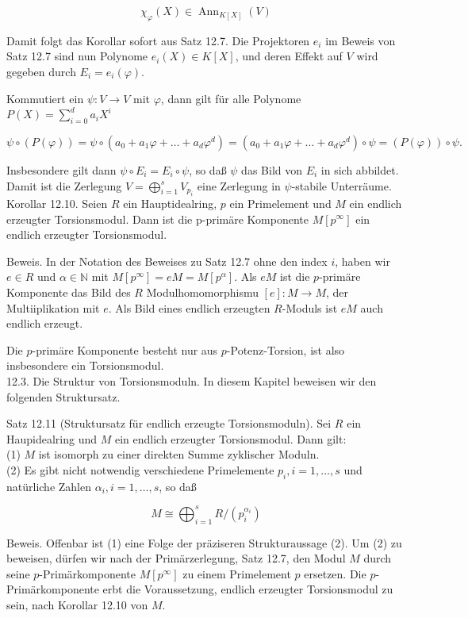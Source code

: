 \documentclass[10pt, letterpaper]{article}
\begin{document}
$$
\chi_{\varphi}(X) \in \operatorname{Ann}_{K[X]}(V)
$$

Damit folgt das Korollar sofort aus Satz 12.7. Die Projektoren $e_{i}$ im Beweis von Satz 12.7 sind nun Polynome $e_{i}(X) \in K[X]$, und deren Effekt auf $V$ wird gegeben durch $E_{i}=e_{i}(\varphi)$.

Kommutiert ein $\psi: V \rightarrow V$ mit $\varphi$, dann gilt für alle Polynome $P(X)=\sum_{i=0}^{d} a_{i} X^{i}$

$$
\psi \circ(P(\varphi))=\psi \circ\left(a_{0}+a_{1} \varphi+\ldots+a_{d} \varphi^{d}\right)=\left(a_{0}+a_{1} \varphi+\ldots+a_{d} \varphi^{d}\right) \circ \psi=(P(\varphi)) \circ \psi .
$$

Insbesondere gilt dann $\psi \circ E_{i}=E_{i} \circ \psi$, so daß $\psi$ das Bild von $E_{i}$ in sich abbildet. Damit ist die Zerlegung $V=\bigoplus_{i=1}^{s} V_{p_{i}}$ eine Zerlegung in $\psi$-stabile Unterräume.\\
Korollar 12.10. Seien $R$ ein Hauptidealring, $p$ ein Primelement und $M$ ein endlich erzeugter Torsionsmodul. Dann ist die p-primäre Komponente $M\left[p^{\infty}\right]$ ein endlich erzeugter Torsionsmodul.

Beweis. In der Notation des Beweises zu Satz 12.7 ohne den index $i$, haben wir $e \in R$ und $\alpha \in \mathbb{N}$ mit $M\left[p^{\infty}\right]=e M=M\left[p^{\alpha}\right]$. Als $e M$ ist die $p$-primäre Komponente das Bild des $R$ Modulhomomorphismu $[e]: M \rightarrow M$, der Multiiplikation mit $e$. Als Bild eines endlich erzeugten $R$-Moduls ist $e M$ auch endlich erzeugt.

Die $p$-primäre Komponente besteht nur aus $p$-Potenz-Torsion, ist also insbesondere ein Torsionsmodul.\\
12.3. Die Struktur von Torsionsmoduln. In diesem Kapitel beweisen wir den folgenden Struktursatz.

Satz 12.11 (Struktursatz für endlich erzeugte Torsionsmoduln). Sei $R$ ein Haupidealring und $M$ ein endlich erzeugter Torsionsmodul. Dann gilt:\\
(1) $M$ ist isomorph zu einer direkten Summe zyklischer Moduln.\\
(2) Es gibt nicht notwendig verschiedene Primelemente $p_{i}, i=1, \ldots, s$ und natürliche Zahlen $\alpha_{i}, i=1, \ldots, s$, so daß

$$
M \cong \bigoplus_{i=1}^{s} R /\left(p_{i}^{\alpha_{i}}\right)
$$

Beweis. Offenbar ist (1) eine Folge der präziseren Strukturaussage (2). Um (2) zu beweisen, dürfen wir nach der Primärzerlegung, Satz 12.7, den Modul $M$ durch seine $p$-Primärkomponente $M\left[p^{\infty}\right]$ zu einem Primelement $p$ ersetzen. Die $p$-Primärkomponente erbt die Voraussetzung, endlich erzeugter Torsionsmodul zu sein, nach Korollar 12.10 von $M$.
\end{document}
